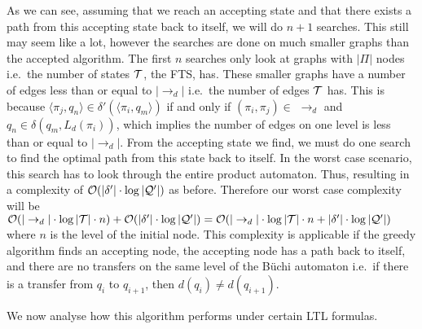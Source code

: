 As we can see, assuming that we reach an accepting state and that there exists a path from this accepting state back to itself, we will do $n+1$ searches. This still may seem like a lot, however the searches are done on much smaller graphs than the accepted algorithm. The first $n$ searches only look at graphs with $|\Pi|$ nodes i.e.\ the number of states $\mathcal{T}$, the FTS, has. These smaller graphs have a number of edges less than or equal to $|\rightarrow_d|$ i.e.\ the number of edges $\mathcal{T}$ has. This is because $\langle \pi_j, q_n \rangle \in \delta' (\langle \pi_i, q_m \rangle )$ if and only if $(\pi_i , \pi_j ) \in$ $\rightarrow_d$ and $q_n \in \delta (q_m, L_d(\pi_i))$, which implies the number of edges on one level is less than or equal to $|\rightarrow_d|$. From the accepting state we find, we must do one search to find the optimal path from this state back to itself. In the worst case scenario, this search has to look through the entire product automaton. Thus, resulting in a complexity of $\mathcal{O}(|\delta'| \cdot \log|\mathcal{Q}'|)$ as before. Therefore our worst case complexity will be $\mathcal{O}(|\rightarrow_d|\cdot \log |\mathcal{T}| \cdot n) + \mathcal{O}(|\delta'| \cdot \log|\mathcal{Q}'|) = \mathcal{O}(|\rightarrow_d|\cdot \log |\mathcal{T}| \cdot n + |\delta'| \cdot \log|\mathcal{Q}'|)$ where $n$ is the level of the initial node. This complexity is applicable if the greedy algorithm finds an accepting node, the accepting node has a path back to itself, and there are no transfers on the same level of the B\"uchi automaton i.e.\ if there is a transfer from $q_i$ to $q_{i+1}$, then $d(q_i) \neq d(q_{i+1})$. %


We now analyse how this algorithm performs under certain LTL formulas. 